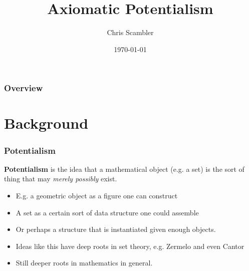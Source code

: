 \documentclass{beamer}
\title[Axiomatic Potentialism]{Axiomatic Potentialism}
\author{Chris Scambler}
\institute[ASC] 
{
All Souls College, \\
Oxford University \\ 
\medskip
\textit{chris.scambler@all-souls.ox.ac.uk} 
}
\date{\today}
\begin{document}
\begin{frame}
\titlepage 
\end{frame}

\begin{frame}
\frametitle{Overview} 
\tableofcontents 
\end{frame}
\section{Background}

\begin{frame}
\frametitle{Potentialism}
\begin{block}
    {\bf Potentialism} is the idea that a mathematical object (e.g. a set) is the sort 
    of thing that may \emph{merely possibly} exist.
\end{block}
\begin{itemize}
    \item<3-> E.g. a geometric object as a figure one can construct
    \item<4-> A set as a certain sort of data structure one could assemble
    \item<5-> Or perhaps a structure that is instantiated given enough objects.
    \item<6-> Ideas like this have deep roots in set theory, e.g. Zermelo and even Cantor
    \item<7-> Still deeper roots in mathematics in general.
\end{itemize}
\end{frame}
\end{document}
